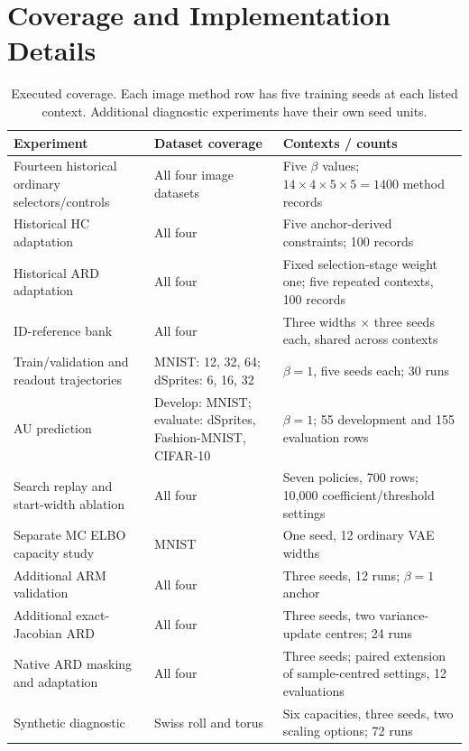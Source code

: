 \section{Coverage and Implementation Details}\label{app:coverage}
\begin{table}[H]
\caption{Executed coverage. Each image method row has five training
seeds at each listed context. Additional diagnostic experiments have
their own seed units.}
\label{tab:coverage}\small
\begin{tabularx}{\textwidth}{>{\raggedright\arraybackslash}p{}>{\raggedright\arraybackslash}p{}>{\raggedright\arraybackslash}X}\toprule
Experiment & Dataset coverage & Contexts / counts \\\midrule
Fourteen historical ordinary selectors/controls & All four image datasets & Five $\beta$ values; $14\times4\times5\times5=1400$ method records \\
Historical HC adaptation & All four & Five anchor-derived constraints; 100 records \\
Historical ARD adaptation & All four & Fixed selection-stage weight one; five repeated contexts, 100 records \\
ID-reference bank & All four & Three widths $\times$ three seeds each, shared across contexts \\
Train/validation and readout trajectories & MNIST: 12, 32, 64; dSprites: 6, 16, 32 & $\beta=1$, five seeds each; 30 runs \\
AU prediction & Develop: MNIST; evaluate: dSprites, Fashion-MNIST, CIFAR-10 & $\beta=1$; 55 development and 155 evaluation rows \\
Search replay and start-width ablation & All four & Seven policies, 700 rows; 10,000 coefficient/threshold settings \\
Separate MC ELBO capacity study & MNIST & One seed, 12 ordinary VAE widths \\
Additional ARM validation & All four & Three seeds, 12 runs; $\beta=1$ anchor \\
Additional exact-Jacobian ARD & All four & Three seeds, two variance-update centres; 24 runs \\
Native ARD masking and adaptation & All four & Three seeds; paired extension of sample-centred settings, 12 evaluations \\
Synthetic diagnostic & Swiss roll and torus & Six capacities, three seeds, two scaling options; 72 runs \\
\bottomrule\end{tabularx}
\end{table}

